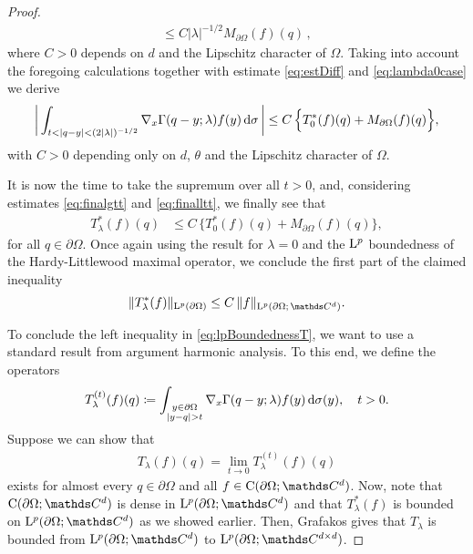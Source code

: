 \begin{proof}
\begin{align*}
     \leq C |\lambda|^{-1/2} M_{\partial\Omega}(f)(q)\,,
   \end{align*}
   where $C > 0$ depends on $d$ and the Lipschitz character of $\Omega$.
   Taking into account the foregoing calculations together with estimate \eqref{eq:estDiff} and \eqref{eq:lambda0case} we derive
   \begin{align}
     \label{eq:finalltt}
     \bigg| \int_{t < |q - y| < (2|\lambda|)^{-1/2}} \nabla_x\Gamma(q - y; \lambda) f(y)  \, {\operatorname{d}\!{\sigma}}\, \bigg| 
     \leq C\, \Big\{ T_0^*(f)(q) + M_{\partial\Omega}(f)(q) \Big\},
   \end{align}
   with $C > 0$ depending only on $d$, $\theta$ and the Lipschitz character of $\Omega$.

   It is now the time to take the supremum over all $t > 0$, and, considering estimates \eqref{eq:finalgtt} and \eqref{eq:finalltt}, we finally see that
   \begin{align*}
     T_\lambda^*(f)(q)
     &\leq C\, \Big\{  T_0^*(f)(q)+ M_{\partial\Omega}(f)(q) \Big\},
   \end{align*}
   for all $q \in \partial\Omega$. Once again using the result for $\lambda = 0$ and the $\mathrm{L}^p$ boundedness of the Hardy-Littlewood maximal operator, we conclude the first part of the claimed inequality
   \begin{align*}
     \|T_\lambda^*(f) \|_{\Ell^p(\partial\Omega)} \leq C\, \|f\|_{\Ell^p(\partial\Omega; \,\C^d)}.
   \end{align*}

   To conclude the left inequality in \eqref{eq:lpBoundednessT}, we want to use a standard result from argument harmonic analysis.
   To this end, we define the operators
   \begin{align*}
     T_\lambda^{(t)}(f)(q) \coloneqq \int_{\substack{y \in \partial\Omega \\ |y - q| > t}} \nabla_x \Gamma(q - y; \lambda) f(y) \, {\operatorname{d}\!{\sigma}}(y), \quad t > 0.
   \end{align*}
   Suppose we can show that
   \begin{align}
     \label{eq:pointwiseLimit}
     T_\lambda(f)(q) = \lim_{t \to 0} T_\lambda^{(t)}(f)(q) 
   \end{align}
   exists for almost every $q \in \partial\Omega$ and all $f \in \CC(\partial\Omega; \C^d)$. Now, note that $\CC(\partial\Omega; \C^d)$ is dense in $\Ell^p(\partial\Omega; \C^d)$ and that $T_\lambda^*(f)$ is bounded on $\Ell^p(\partial\Omega; \C^d)$ as we showed earlier.
   Then, Grafakos \cite[Thm.\@~2.1.14]{grafakos2014classical} gives that $T_\lambda$ is bounded from $\Ell^p(\partial\Omega; \C^{d})$ to $\Ell^p(\partial\Omega; \C^{d \times d})$.


\end{proof}
